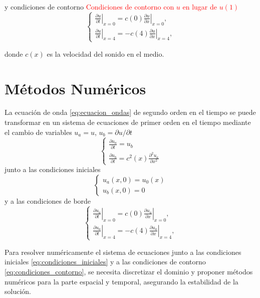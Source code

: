 \documentclass[aps,prb,twocolumn,superscriptaddress,floatfix,longbibliography,10pt]{revtex4-2}
\newcounter{para}
\begin{document}
y condiciones de contorno
\textcolor{red}{Condiciones de contorno con $u$ en lugar de $u(1)$}
\begin{equation}
  \left \{\begin{matrix}
    \left . \frac{\partial u}{\partial t} \right |_{x=0} = c(0) \left . \frac{\partial u}{\partial x} \right |_{x=0} ,\\
    \left . \frac{\partial u}{\partial t} \right |_{x=4} = - c(4) \left . \frac{\partial u}{\partial x} \right |_{x=4},
   \end{matrix}\right .
  \label{eq:condiciones_contorno}
\end{equation}

donde $c(x)$ es la velocidad del sonido en el medio.

\section{Métodos Numéricos}

La ecuación de onda \ref{eq:ecuacion_ondas} de segundo orden en el tiempo se puede transformar en un sistema de ecuaciones de primer orden en el tiempo mediante el cambio de variables $u_a = u$, $u_b = \partial u /\partial t$
\[
  \left \{ \begin{matrix}
     \frac{\partial u_a}{\partial t} = u_b   \\
     \frac{\partial u_b}{\partial t} = c^2(x) \frac{\partial^2 u_a}{\partial x^2}
  \end{matrix} \right .
  \]
junto a las condiciones iniciales
\[ \left \{ \begin{matrix}
     u_a(x,0) = u_0(x) \\
     u_b(x,0) = 0
  \end{matrix} \right .
\]  
y a las condiciones de borde
\[
  \left \{ \begin{matrix}
     \left . \frac{\partial u_a}{\partial t} \right |_{x=0} = c(0) \left . \frac{\partial u_a}{\partial x} \right |_{x=0} ,\\
     \left . \frac{\partial u_a}{\partial t} \right |_{x=4} = - c(4) \left . \frac{\partial u_a}{\partial x} \right |_{x=4},
  \end{matrix} \right .
\]



Para resolver numéricamente el sistema de ecuaciones junto a las condiciones iniciales \ref{eq:condiciones_iniciales} y a las condiciones de contorno \ref{eq:condiciones_contorno}, se necesita discretizar el dominio y proponer métodos numéricos para la parte espacial y temporal, asegurando la estabilidad de la solución.
\end{document}
